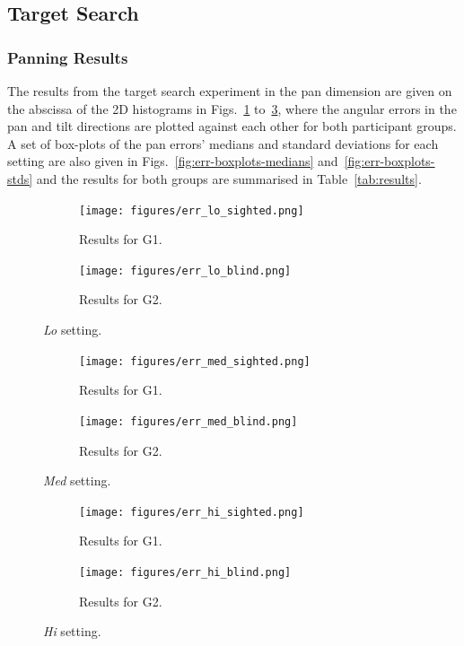\documentclass[sigconf, review=true, screen=true, anonymous=true]{acmart}
\begin{document}
\subsection{Target Search}

\subsubsection{Panning Results}

The results from the target search experiment in the pan dimension are given on the abscissa of the 2D histograms in Figs.~\ref{fig:err-results-lo} to~\ref{fig:err-results-hi}, where the angular errors in the pan and tilt directions are plotted against each other for both participant groups.
A set of box-plots of the pan errors' medians and standard deviations for each setting are also given in Figs.~\ref{fig:err-boxplots-medians} and~\ref{fig:err-boxplots-stds} and the results for both groups are summarised in Table~\ref{tab:results}.

\begin{figure}
  \centering
  \begin{subfigure}[t]{0.5\textwidth}
    \centering
    \texttt{[image: figures/err\_lo\_sighted.png]}
    \caption{Results for G1. }
  \end{subfigure}%
  \begin{subfigure}[t]{0.5\textwidth}
    \centering
    \texttt{[image: figures/err\_lo\_blind.png]}
    \caption{Results for G2. }
  \end{subfigure}
  \caption{\emph{Lo} setting. }
\label{fig:err-results-lo}
\end{figure}
\begin{figure}
  \centering
  \begin{subfigure}[t]{0.5\textwidth}
    \centering
    \texttt{[image: figures/err\_med\_sighted.png]}
    \caption{Results for G1. }
  \end{subfigure}%
  \begin{subfigure}[t]{0.5\textwidth}
    \centering
    \texttt{[image: figures/err\_med\_blind.png]}
    \caption{Results for G2. }
  \end{subfigure}
  \caption{\emph{Med} setting. }
\label{fig:err-results-med}
\end{figure}
\begin{figure}
  \centering
  \begin{subfigure}[t]{0.5\textwidth}
    \centering
    \texttt{[image: figures/err\_hi\_sighted.png]}
    \caption{Results for G1. }
  \end{subfigure}%
  \begin{subfigure}[t]{0.5\textwidth}
    \centering
    \texttt{[image: figures/err\_hi\_blind.png]}
    \caption{Results for G2. }
  \end{subfigure}
  \caption{\emph{Hi} setting. }
\label{fig:err-results-hi}
\end{figure}
\end{document}
